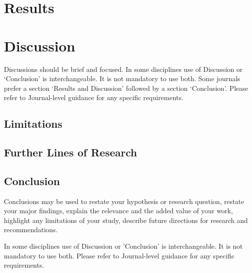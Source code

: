 \documentclass[sn-mathphys, Numbered]{sn-jnl}%
\theoremstyle{thmstyleone}%
\theoremstyle{thmstyletwo}%
\theoremstyle{thmstylethree}%
\begin{document}



\section{Results}\label{Results}

\section{Discussion}\label{Discussion}

Discussions should be brief and focused. In some disciplines use of Discussion or `Conclusion' is interchangeable. It is not mandatory to use both. Some journals prefer a section `Results and Discussion' followed by a section `Conclusion'. Please refer to Journal-level guidance for any specific requirements. 


\subsection{Limitations}\label{Limitations}

\subsection{Further Lines of Research}\label{Further Lines of Research}

\subsection{Conclusion}\label{Conclusion}

Conclusions may be used to restate your hypothesis or research question, restate your major findings, explain the relevance and the added value of your work, highlight any limitations of your study, describe future directions for research and recommendations. 

In some disciplines use of Discussion or 'Conclusion' is interchangeable. It is not mandatory to use both. Please refer to Journal-level guidance for any specific requirements. 


\printbibliography
\end{document}
